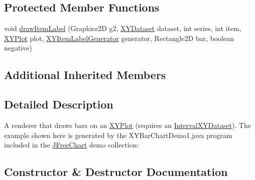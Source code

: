 \subsection*{Protected Member Functions}
\begin{DoxyCompactItemize}
\item 
void \mbox{\hyperlink{classorg_1_1jfree_1_1chart_1_1renderer_1_1xy_1_1_x_y_bar_renderer_a8a263b5b7875308d41ef8597069a0fb0}{draw\+Item\+Label}} (Graphics2D g2, \mbox{\hyperlink{interfaceorg_1_1jfree_1_1data_1_1xy_1_1_x_y_dataset}{X\+Y\+Dataset}} dataset, int series, int item, \mbox{\hyperlink{classorg_1_1jfree_1_1chart_1_1plot_1_1_x_y_plot}{X\+Y\+Plot}} plot, \mbox{\hyperlink{interfaceorg_1_1jfree_1_1chart_1_1labels_1_1_x_y_item_label_generator}{X\+Y\+Item\+Label\+Generator}} generator, Rectangle2D bar, boolean negative)
\end{DoxyCompactItemize}
\subsection*{Additional Inherited Members}


\subsection{Detailed Description}
A renderer that draws bars on an \mbox{\hyperlink{}{X\+Y\+Plot}} (requires an \mbox{\hyperlink{}{Interval\+X\+Y\+Dataset}}). The example shown here is generated by the {\ttfamily X\+Y\+Bar\+Chart\+Demo1.\+java} program included in the \mbox{\hyperlink{classorg_1_1jfree_1_1chart_1_1_j_free_chart}{J\+Free\+Chart}} demo collection\+: ~\newline
~\newline
  

\subsection{Constructor \& Destructor Documentation}
\mbox{\label{classorg_1_1jfree_1_1chart_1_1renderer_1_1xy_1_1_x_y_bar_renderer_aee585e05f8764cd20d6cc9f86e61e2fc}} 
